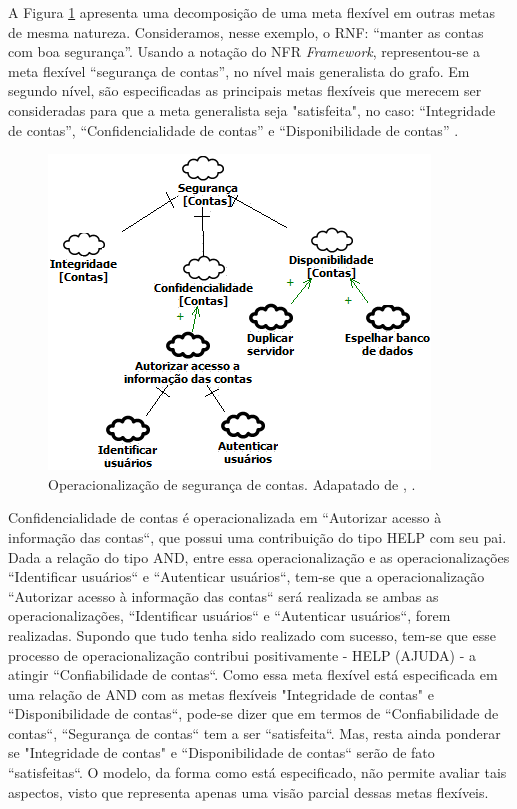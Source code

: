 \pagebreak

A Figura \ref{exemploNFR} apresenta uma decomposição de uma meta flexível em outras metas de mesma natureza. Consideramos, nesse exemplo, o RNF: “manter as contas com boa segurança”. Usando a notação do NFR \textit{Framework}, representou-se a meta flexível  “segurança de contas”, no nível mais generalista do grafo. Em segundo nível, são especificadas as principais metas flexíveis que merecem ser consideradas para que a meta generalista seja "satisfeita", no caso: “Integridade de contas”, “Confidencialidade de contas” e “Disponibilidade de contas” \cite{chung2012non}.

\begin{figure}[h!]
	\centering
	\includegraphics[keepaspectratio=true,scale=1.0]{figuras/exemploNFR.png}
	\caption{Operacionalização de segurança de contas. Adapatado de \cite{chung2012non}, \cite{affleck2012supporting}.}
	\label{exemploNFR}
\end{figure} 

Confidencialidade de contas é operacionalizada em ``Autorizar acesso à informação das contas``, que possui uma contribuição do tipo HELP com seu pai. Dada a relação do tipo AND, entre essa operacionalização e as operacionalizações ``Identificar usuários`` e ``Autenticar usuários``, tem-se que a operacionalização ``Autorizar acesso à informação das contas``  será realizada se ambas as operacionalizações, ``Identificar usuários`` e ``Autenticar usuários``, forem realizadas. Supondo que tudo tenha sido realizado com sucesso, tem-se que esse processo de operacionalização contribui positivamente - HELP (AJUDA) - a atingir ``Confiabilidade de contas``. Como essa meta flexível está especificada em uma relação de AND com as metas flexíveis "Integridade de contas" e ``Disponibilidade de contas``, pode-se dizer que em termos de ``Confiabilidade de contas``, ``Segurança de contas`` tem a ser ``satisfeita``. Mas, resta ainda ponderar se "Integridade de contas" e ``Disponibilidade de contas`` serão de fato ``satisfeitas``. O modelo, da forma como está especificado, não permite avaliar tais aspectos, visto que representa apenas uma visão parcial dessas metas flexíveis.


